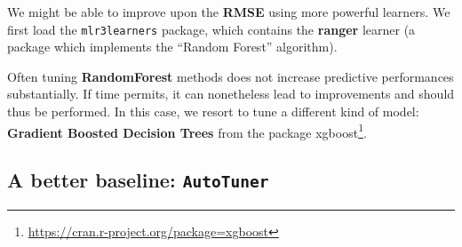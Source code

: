 \documentclass[12pt,]{scrbook}
\newenvironment{Shaded}{}{}
\newcommand{\DataTypeTok}[1]{#1}
\newcommand{\DecValTok}[1]{#1}
\newcommand{\KeywordTok}[1]{\textcolor[rgb]{0.00,0.00,1.00}{#1}}
\newcommand{\NormalTok}[1]{#1}
\newcommand{\OperatorTok}[1]{#1}
\newcommand{\StringTok}[1]{\textcolor[rgb]{0.00,0.50,0.50}{#1}}
\renewcommand{\href}[2]{#2\footnote{\url{#1}}}
\begin{document}
We might be able to improve upon the \textbf{RMSE} using more powerful learners.
We first load the \texttt{mlr3learners} package, which contains the \textbf{ranger} learner (a package which implements the ``Random Forest'' algorithm).

\begin{Shaded}
\end{Shaded}

Often tuning \textbf{RandomForest} methods does not increase predictive performances substantially.
If time permits, it can nonetheless lead to improvements and should thus be performed.
In this case, we resort to tune a different kind of model: \textbf{Gradient Boosted Decision Trees} from the package \href{https://cran.r-project.org/package=xgboost}{xgboost}.

\hypertarget{a-better-baseline-autotuner}{%
\subsection{\texorpdfstring{A better baseline: \texttt{AutoTuner}}{A better baseline: AutoTuner}}\label{a-better-baseline-autotuner}}
\end{document}
